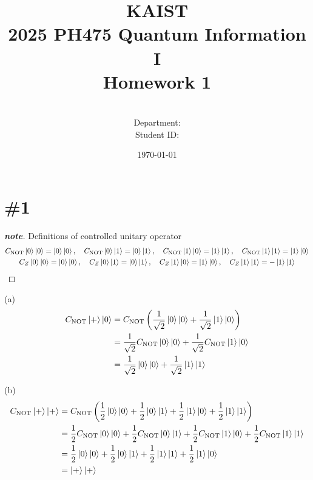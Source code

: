 \documentclass[a4paper,11pt]{article}
\title{KAIST\\2025 PH475 Quantum Information I\\
Homework 1\bigskip}
\author{\textbf{\Large \name} \\
Department: \department\\
Student ID: \studentid}
\date{\today}
\newenvironment{note}
  {\renewcommand\qedsymbol{$\blacksquare$}\begin{proof}[\textnormal{\textbf{note}}]}
  {\end{proof}}
\begin{document}
\thispagestyle{empty}
\maketitle
\tableofcontents
{}

\newcommand{\der}[2][]{\frac{d #1}{d #2}}
\newcommand{\pder}[2][]{\frac{\partial #1}{\partial #2}}
\newcommand{\grad}{\operatorname{grad}}
\newcommand{\diver}{\operatorname{div}}
\newcommand{\curl}{\operatorname{curl}}
\newcommand{\tr}{\operatorname{tr}}

\newcommand{\cnot}{C_{\text{NOT}}}
\newcommand{\cz}{C_{Z}}

\section{\#1}

\begin{note}
Definitions of controlled unitary operator
\begin{gather}
    \cnot\ket{0}\ket{0} = \ket{0}\ket{0},\quad
    \cnot\ket{0}\ket{1} = \ket{0}\ket{1},\quad
    \cnot\ket{1}\ket{0} = \ket{1}\ket{1},\quad
    \cnot\ket{1}\ket{1} = \ket{1}\ket{0}\\
    \cz\ket{0}\ket{0} = \ket{0}\ket{0},\quad
    \cz\ket{0}\ket{1} = \ket{0}\ket{1},\quad
    \cz\ket{1}\ket{0} = \ket{1}\ket{0},\quad
    \cz\ket{1}\ket{1} = -\ket{1}\ket{1}
\end{gather}

\end{note}

(a)
\begin{align}
    \cnot \ket{+}\ket{0}
    &=\cnot\left(\frac{1}{\sqrt{2}}\ket{0}\ket{0} + \frac{1}{\sqrt{2}}\ket{1}\ket{0}\right) \\
    &=\frac{1}{\sqrt{2}}\cnot\ket{0}\ket{0} + \frac{1}{\sqrt{2}}\cnot\ket{1}\ket{0} \\
    &=\frac{1}{\sqrt{2}}\ket{0}\ket{0} + \frac{1}{\sqrt{2}}\ket{1}\ket{1}
\end{align}

(b)
\begin{align}
    \cnot \ket{+}\ket{+}
    &=\cnot\left(\frac{1}{2}\ket{0}\ket{0} + \frac{1}{2}\ket{0}\ket{1} + \frac{1}{2}\ket{1}\ket{0} + \frac{1}{2}\ket{1}\ket{1}\right) \\
    &=\frac{1}{2}\cnot\ket{0}\ket{0} + \frac{1}{2}\cnot\ket{0}\ket{1} + \frac{1}{2}\cnot\ket{1}\ket{0} + \frac{1}{2}\cnot\ket{1}\ket{1} \\
    &=\frac{1}{2}\ket{0}\ket{0} + \frac{1}{2}\ket{0}\ket{1} + \frac{1}{2}\ket{1}\ket{1} + \frac{1}{2}\ket{1}\ket{0}\\
    &=\ket{+}\ket{+}
\end{align}
\end{document}
